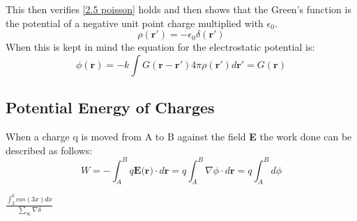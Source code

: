 \noindent This then verifies \ref{2.5 poisson} holds and then shows that the Green's function is the potential of a negative unit point charge multiplied with $\epsilon_0$.
\begin{equation}
    \rho(\textbf{r}') = -\epsilon_0 \delta(\textbf{r}')
\end{equation}
When this is kept in mind the equation for the electrostatic potential is:
\begin{equation}
    \phi(\textbf{r})= -k \int G(\textbf{r}-\textbf{r}')4 \pi \rho(\textbf{r}') d \textbf{r}' = G(\textbf{r})
\end{equation}
\subsection{Potential Energy of Charges}
When a charge q is moved from A to B against the field \textbf{E} the work done can be described as follows:
\begin{equation}
    W = - \int_A^B q\textbf{E(r)} \cdot d\textbf{r} = q\int_A^B \nabla\phi \cdot d\textbf{r} =  q\int_A^B d\phi 
\end{equation}


$\frac{\int_2^6 cos(3x)dx}{\sum_\infty \nabla \delta}$